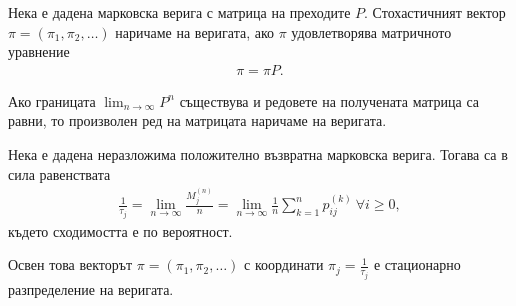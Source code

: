 \documentclass[numbers=endperiod, bibliography=totocnumbered]{scrartcl}
\begin{document}
\begin{definition}
  Нека е дадена марковска верига с матрица на преходите \( P \). Стохастичният вектор \( \pi = (\pi_1, \pi_2, \ldots) \) наричаме  на веригата, ако \( \pi \) удовлетворява матричното уравнение
  \begin{align*}
    \pi = \pi P.
  \end{align*}

  Ако границата \( \lim_{n \to \infty} P^n \) съществува и редовете на получената матрица са равни, то произволен ред на матрицата наричаме  на веригата.
\end{definition}

\begin{theorem}
  Нека е дадена неразложима положително възвратна марковска верига. Тогава са в сила равенствата
  \begin{align*}
    \frac 1 {\tau_j}
    =
    \lim_{n \to \infty} \frac {M^{(n)}_j} n
    =
    \lim_{n \to \infty} \frac 1 n \sum_{k=1}^n p_{ij}^{(k)}~\forall i \geq 0,
  \end{align*}
  където сходимостта е по вероятност.

  Освен това векторът \( \pi = (\pi_1, \pi_2, \ldots) \) с координати \( \pi_j = \frac 1 {\tau_j} \) е стационарно разпределение на веригата.
\end{theorem}
\end{document}
